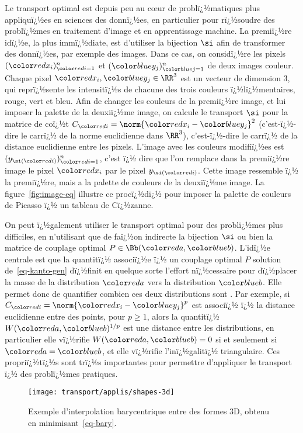 Le transport optimal est depuis peu au c\oe{}ur de problï¿½matiques plus appliquï¿½es en sciences des donnï¿½es, en particulier pour rï¿½soudre des problï¿½mes en traitement d'image et en apprentissage machine. 
%
La premiï¿½re idï¿½e, la plus immï¿½diate, est d'utiliser la bijection $\si$ afin de transformer des donnï¿½es, par exemple des images. Dans ce cas, on considï¿½re les pixels $(\Red{x_i})_{\iC=1}^n$ et $(\Blu{y_j})_{\jC=1}^n$ de deux images couleur. Chaque pixel $\Red{x_i}, \Blu{y_j} \in \RR^3$ est un vecteur de dimension 3, qui reprï¿½sente les intensitï¿½s de chacune des trois couleurs ï¿½lï¿½mentaires, rouge, vert et bleu. Afin de changer les couleurs de la premiï¿½re image, et lui imposer la palette de la deuxiï¿½me image, on calcule le transport $\si$ pour la matrice de coï¿½t $C_{\iC} = \norm{\Red{x_i} - \Blu{y_j}}^2$ (c'est-ï¿½-dire le carrï¿½ de la norme euclidienne dans $\RR^3$), c'est-ï¿½-dire le carrï¿½ de la distance euclidienne entre les pixels. L'image avec les couleurs modifiï¿½es est $(y_{\si(\iC)})_{\iC=1}^n$, c'est ï¿½ dire que l'on remplace dans la premiï¿½re image le pixel $\Red{x_i}$ par le pixel $y_{\si(\iC)}$. Cette image ressemble ï¿½ la premiï¿½re, mais a la palette de couleurs de la deuxiï¿½me image.
%
La figure~\ref{fig:image-eq} illustre ce procï¿½dï¿½ pour imposer la palette de couleurs de Picasso ï¿½ un tableau de Cï¿½zanne. 

On peut ï¿½galement utiliser le transport optimal pour des problï¿½mes plus difficiles, en n'utilisant que de faï¿½on indirecte la bijection $\si$ ou bien la matrice de couplage optimal $P \in \Bb(\aC,\bC)$. L'idï¿½e centrale est que la quantitï¿½ associï¿½e ï¿½ un couplage optimal $P$ solution de~\eqref{eq-kanto-gen}
dï¿½finit en quelque sorte l'effort nï¿½cessaire pour dï¿½placer la masse de la distribution $\aC$ vers la distribution $\bC$. Elle permet donc de quantifier combien ces deux distributions sont . Par exemple, si $C_{\iC} = \norm{\Red{x_i} - \Blu{y_j}}^p$ est associï¿½ ï¿½ la distance euclidienne entre des points, pour $p \geq 1$, alors la quantitï¿½ $W(\aC,\bC)^{1/p}$ est une distance entre les distributions, en particulier elle vï¿½rifie $W(\aC,\bC)=0$ si et seulement si $\aC=\bC$, et elle vï¿½rifie l'inï¿½galitï¿½ triangulaire. Ces propriï¿½tï¿½s sont trï¿½s importantes pour permettre d'appliquer le transport ï¿½ des problï¿½mes pratiques.


\begin{figure}\centering
        \texttt{[image: transport/applis/shapes-3d]}
    \caption{\label{fig:barycenters} Exemple d'interpolation barycentrique entre des formes 3D, obtenu en minimisant~\eqref{eq-bary}.  }
\end{figure}


